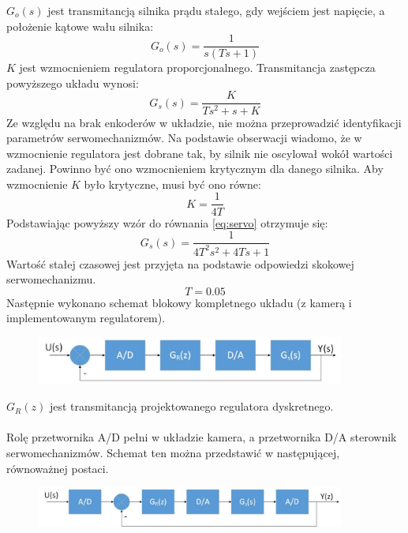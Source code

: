 \(G_o(s)\) jest transmitancją silnika prądu stałego, gdy wejściem jest napięcie, a położenie kątowe wału silnika:
\begin{equation}
G_o(s)=\frac{1}{s(Ts+1)}
\end{equation}
\(K\) jest wzmocnieniem regulatora proporcjonalnego.\newline
Transmitancja zastępcza powyższego układu wynosi:
\begin{equation}
\label{eq:servo}
G_s(s)=\frac{K}{Ts^2+s+K}
\end{equation}
Ze względu na brak enkoderów w układzie, nie można przeprowadzić identyfikacji parametrów serwomechanizmów. Na podstawie obserwacji wiadomo, że w wzmocnienie regulatora jest dobrane tak, by silnik nie oscylował wokół wartości zadanej. Powinno być ono wzmocnieniem krytycznym dla danego silnika. Aby wzmocnienie \(K\) było krytyczne, musi być ono równe:
\begin{equation}
\label{eq:kryt}
K=\frac{1}{4T}
\end{equation}
Podstawiając powyższy wzór do równania \ref{eq:servo} otrzymuje się:
\begin{equation}
G_s(s)=\frac{1}{4T^2s^2+4Ts+1}
\end{equation}
Wartość stałej czasowej jest przyjęta na podstawie odpowiedzi skokowej serwomechanizmu.
\begin{equation}
T=0.05
\end{equation}
Następnie wykonano schemat blokowy kompletnego układu (z kamerą i implementowanym regulatorem).

\begin{figure}[h]
	\centering
	\includegraphics[width=4in]{uklad.jpg}
\end{figure}

\(G_R(z)\) jest transmitancją projektowanego regulatora dyskretnego.
\paragraph*{}
Rolę przetwornika A/D pełni w układzie kamera, a przetwornika D/A sterownik serwomechanizmów. Schemat ten można przedstawić w następującej, równoważnej postaci.

\begin{figure}[h]
	\centering
	\includegraphics[width=4in]{uklad_digital.jpg}
\end{figure}

